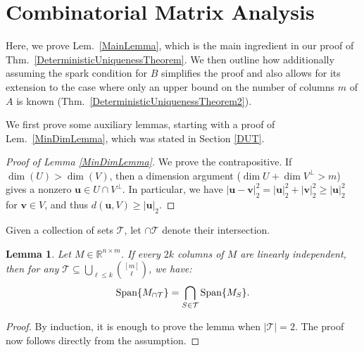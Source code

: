 \documentclass[journal, twocolumn]{IEEEtran}
\newtheorem{lemma}{Lemma}
\begin{document}
 \clearpage

\appendices
\section{Combinatorial Matrix Analysis}\label{appendixA}

Here, we prove Lem.~\ref{MainLemma}, which is the main ingredient in our proof of Thm.~\ref{DeterministicUniquenessTheorem}. We then outline how additionally assuming the spark condition for $B$ simplifies the proof and also allows for its extension to the case where only an upper bound on the number of columns $m$ of $A$ is known (Thm.~\ref{DeterministicUniquenessTheorem2}). 

We first prove some auxiliary lemmas, starting with a proof of Lem.~\ref{MinDimLemma}, which was stated in Section \ref{DUT}. 
\begin{proof}[Proof of Lemma \ref{MinDimLemma}]
We prove the contrapositive.  If $\dim(U) > \dim(V)$, then a dimension argument ($\dim U + \dim V^\perp > m$) gives a nonzero $\mathbf{u} \in U \cap V^\perp$.  In particular, we have $|\mathbf{u} - \mathbf{v}|_2^2 = |\mathbf{u}|_2^2 + |\mathbf{v}|_2^2 \geq |\mathbf{u}|_2^2$ for $\mathbf{v} \in V$, and thus $d(\mathbf{u},V) \geq |\mathbf{u}|_2$.
\end{proof}

Given a collection of sets $\mathcal{T}$, let $\cap \mathcal{T}$ denote their intersection.
\begin{lemma}\label{SpanIntersectionLemma}
Let $M \in \mathbb{R}^{n \times m}$. If every $2k$ columns of $M$ are linearly independent, then for any $\mathcal{T} \subseteq \bigcup_{\ell \leq k} {[m] \choose \ell}$, we have:
\begin{align*}
\text{\rm Span}\{M_{\cap \mathcal{T}}\}  = \bigcap_{S \in \mathcal{T}} \text{\rm Span}\{M_S\}.
\end{align*}
\end{lemma}

\begin{proof}By induction, it is enough to prove the lemma when $|\mathcal{T}| = 2$. The proof now follows directly from the assumption.
\end{proof}


\end{document}
